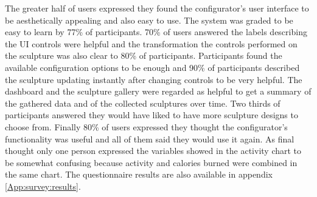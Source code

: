 \documentclass[../medieninformatik-arbeit.tex]{subfiles}
\begin{document}
The greater half of users expressed they found the configurator's user interface to be aesthetically appealing and also easy to use. The system was graded to be easy to learn by 77\% of participants. 70\% of users answered the labels describing the UI controls were helpful and the transformation the controls performed on the sculpture was also clear to 80\% of participants. Participants found the available configuration options to be enough and 90\% of participants described the sculpture updating instantly after changing controls to be very helpful. The dashboard and the sculpture gallery were regarded as helpful to get a summary of the gathered data and of the collected sculptures over time. Two thirds of participants answered they would have liked to have more sculpture designs to choose from.
Finally 80\% of users expressed they thought the configurator's functionality was useful and all of them said they would use it again. As final thought only one person expressed the variables showed in the activity chart to be somewhat confusing because activity and calories burned were combined in the same chart. The questionnaire results are also available in appendix \ref{App:survey:results}.
\end{document}
